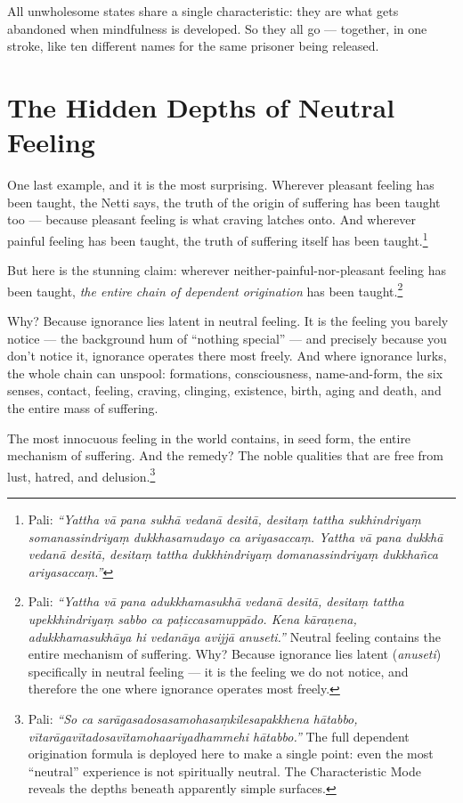 All unwholesome states share a single characteristic: they are what gets abandoned when mindfulness is developed. So they all go --- together, in one stroke, like ten different names for the same prisoner being released.

\section*{The Hidden Depths of Neutral Feeling}

One last example, and it is the most surprising. Wherever pleasant feeling has been taught, the Netti says, the truth of the origin of suffering has been taught too --- because pleasant feeling is what craving latches onto. And wherever painful feeling has been taught, the truth of suffering itself has been taught.\footnote{Pali: \textit{``Yattha vā pana sukhā vedanā desitā, desitaṃ tattha sukhindriyaṃ somanassindriyaṃ dukkhasamudayo ca ariyasaccaṃ. Yattha vā pana dukkhā vedanā desitā, desitaṃ tattha dukkhindriyaṃ domanassindriyaṃ dukkhañca ariyasaccaṃ.''}}

But here is the stunning claim: wherever neither-painful-nor-pleasant feeling has been taught, \textit{the entire chain of dependent origination} has been taught.\footnote{Pali: \textit{``Yattha vā pana adukkhamasukhā vedanā desitā, desitaṃ tattha upekkhindriyaṃ sabbo ca paṭiccasamuppādo. Kena kāraṇena, adukkhamasukhāya hi vedanāya avijjā anuseti.''} Neutral feeling contains the entire mechanism of suffering. Why? Because ignorance lies latent (\textit{anuseti}) specifically in neutral feeling --- it is the feeling we do not notice, and therefore the one where ignorance operates most freely.}

Why? Because ignorance lies latent in neutral feeling. It is the feeling you barely notice --- the background hum of ``nothing special'' --- and precisely because you don't notice it, ignorance operates there most freely. And where ignorance lurks, the whole chain can unspool: formations, consciousness, name-and-form, the six senses, contact, feeling, craving, clinging, existence, birth, aging and death, and the entire mass of suffering.

The most innocuous feeling in the world contains, in seed form, the entire mechanism of suffering. And the remedy? The noble qualities that are free from lust, hatred, and delusion.\footnote{Pali: \textit{``So ca sarāgasadosasamohasaṃkilesapakkhena hātabbo, vītarāgavītadosavītamohaariyadhammehi hātabbo.''} The full dependent origination formula is deployed here to make a single point: even the most ``neutral'' experience is not spiritually neutral. The Characteristic Mode reveals the depths beneath apparently simple surfaces.}


